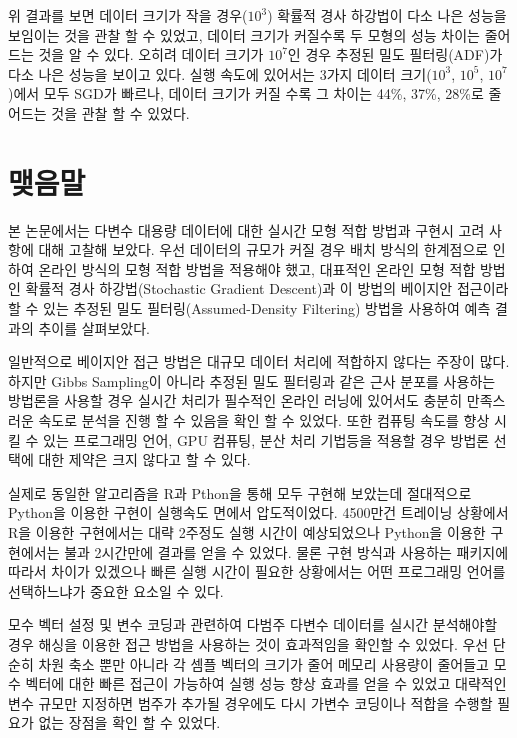 \documentclass[oneside,b5paper,11pt]{book}
\theoremstyle{plain}
\theoremstyle{definition}
\theoremstyle{remark}
\theoremstyle{definition}
\numberwithin{equation}{chapter}
\begin{document}
위 결과를 보면 데이터 크기가 작을 경우($10^3$) 확률적 경사 하강법이 다소 나은 성능을 보임이는 것을 관찰 할 수 있었고, 데이터 크기가 커질수록 두 모형의 성능 차이는 줄어드는 것을 알 수 있다. 오히려 데이터 크기가 $10^7$인 경우 추정된 밀도 필터링(ADF)가 다소 나은 성능을 보이고 있다. 실행 속도에 있어서는 3가지 데이터 크기($10^3$, $10^5$, $10^7$)에서 모두 SGD가 빠르나, 데이터 크기가 커질 수록 그 차이는 44\%, 37\%, 28\%로 줄어드는 것을 관찰 할 수 있었다.





%
%
\chapter{맺음말}
 본 논문에서는 다변수 대용량 데이터에 대한 실시간 모형 적합 방법과 구현시 고려 사항에 대해 고찰해 보았다. 우선 데이터의 규모가 커질 경우 배치 방식의 한계점으로 인하여 온라인 방식의 모형 적합 방법을 적용해야 했고, 대표적인 온라인 모형 적합 방법인 확률적 경사 하강법(Stochastic Gradient Descent)과 이 방법의 베이지안 접근이라 할 수 있는 추정된 밀도 필터링(Assumed-Density Filtering) 방법을 사용하여 예측 결과의 추이를 살펴보았다.

일반적으로 베이지안 접근 방법은 대규모 데이터 처리에 적합하지 않다는 주장이 많다. 하지만 Gibbs Sampling이 아니라 추정된 밀도 필터링과 같은 근사 분포를 사용하는 방법론을 사용할 경우 실시간 처리가 필수적인 온라인 러닝에 있어서도 충분히 만족스러운 속도로 분석을 진행 할 수 있음을 확인 할 수 있었다. 또한 컴퓨팅 속도를 향상 시킬 수 있는 프로그래밍 언어, GPU 컴퓨팅, 분산 처리 기법등을 적용할 경우 방법론 선택에 대한 제약은 크지 않다고 할 수 있다.

실제로 동일한 알고리즘을 R과 Pthon을 통해 모두 구현해 보았는데 절대적으로 Python을 이용한 구현이 실행속도 면에서 압도적이었다. 4500만건 트레이닝 상황에서 R을 이용한 구현에서는 대략 2주정도 실행 시간이 예상되었으나 Python을 이용한 구현에서는 불과 2시간만에 결과를 얻을 수 있었다. 물론 구현 방식과 사용하는 패키지에 따라서 차이가 있겠으나 빠른 실행 시간이 필요한 상황에서는 어떤 프로그래밍 언어를 선택하느냐가 중요한 요소일 수 있다.

모수 벡터 설정 및 변수 코딩과 관련하여 다범주 다변수 데이터를 실시간 분석해야할 경우 해싱을 이용한 접근 방법을 사용하는 것이 효과적임을 확인할 수 있었다. 우선 단순히 차원 축소 뿐만 아니라 각 셈플 벡터의 크기가 줄어 메모리 사용량이 줄어들고 모수 벡터에 대한 빠른 접근이 가능하여 실행 성능 향상 효과를 얻을 수 있었고 대략적인 변수 규모만 지정하면 범주가 추가될 경우에도 다시 가변수 코딩이나 적합을 수행할 필요가 없는 장점을 확인 할 수 있었다.
\end{document}
